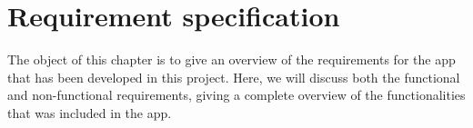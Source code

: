 \chapter{Requirement specification}
\label {sec:recSpecification}

The object of this chapter is to give an overview of the requirements for the app that has been developed in this project. Here, we will discuss both the functional and non-functional requirements, giving a complete overview of the functionalities that was included in the app.



\newpage
